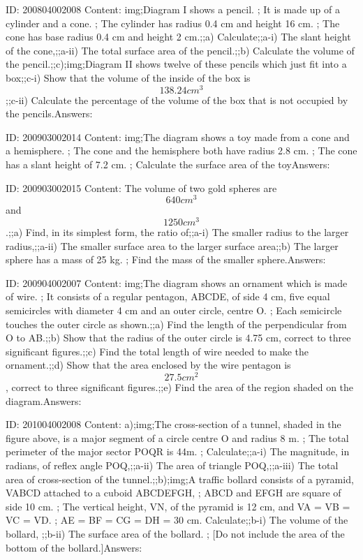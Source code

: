 \documentclass{article}
\begin{document}
ID: 200804002008
Content:
img;Diagram I shows a pencil. ; It is made up of a cylinder and a cone. ; The cylinder has radius 0.4 cm and height 16 cm. ; The cone has base radius 0.4 cm and height 2 cm.;;a) Calculate;;a-i) The slant height of the cone,;;a-ii) The total surface area of the pencil.;;b) Calculate the volume of the pencil.;;c);img;Diagram II shows twelve of these pencils which just fit into a box;;c-i) Show that the volume of the inside of the box is $$138.24 cm^3$$;;c-ii) Calculate the percentage of the volume of the box that is not occupied by the pencils.Answers:

ID: 200903002014
Content:
img;The diagram shows a toy made from a cone and a hemisphere. ; The cone and the hemisphere both have radius 2.8 cm. ; The cone has a slant height of 7.2 cm. ; Calculate the surface area of the toyAnswers:

ID: 200903002015
Content:
The volume of two gold spheres are $$640 cm^3$$ and $$1250 cm^3$$.;;a) Find, in its simplest form, the ratio of;;a-i) The smaller radius to the larger radius,;;a-ii) The smaller surface area to the larger surface area;;b) The larger sphere has a mass of 25 kg. ; Find the mass of the smaller sphere.Answers:

ID: 200904002007
Content:
img;The diagram shows an ornament which is made of wire. ; It consists of a regular pentagon, ABCDE, of side 4 cm, five equal semicircles with diameter 4 cm and an outer circle, centre O. ; Each semicircle touches the outer circle as shown.;;a) Find the length of the perpendicular from O to AB.;;b) Show that the radius of the outer circle is 4.75 cm, correct to three significant figures.;;c) Find the total length of wire needed to make the ornament.;;d) Show that the area enclosed by the wire pentagon is $$27.5 cm^2$$, correct to three significant figures.;;e) Find the area of the region shaded on the diagram.Answers:

ID: 201004002008
Content:
a);img;The cross-section of a tunnel, shaded in the figure above, is a major segment of a circle centre O and radius 8 m. ; The total perimeter of the major sector POQR is 44m. ; Calculate;;a-i) The magnitude, in radians, of reflex angle POQ,;;a-ii) The area of triangle POQ,;;a-iii) The total area of cross-section of the tunnel.;;b);img;A traffic bollard consists of a pyramid, VABCD attached to a cuboid ABCDEFGH, ; ABCD and EFGH are square of side 10 cm. ; The vertical height, VN, of the pyramid is 12 cm, and VA = VB = VC = VD. ; AE = BF = CG = DH = 30 cm. Calculate;;b-i) The volume of the bollard, ;;b-ii) The surface area of the bollard. ; [Do not include the area of the bottom of the bollard.]Answers:
\end{document}
